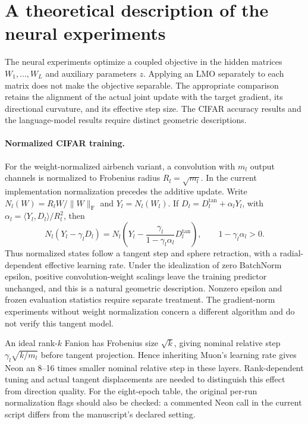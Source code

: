 
\section{A theoretical description of the neural experiments}
\label{tadl:section}

The neural experiments optimize a coupled objective in the hidden matrices
$W_1,\ldots,W_L$ and auxiliary parameters $z$. Applying an LMO separately
to each matrix does not make the objective separable. The appropriate
comparison retains the alignment of the actual joint update with the
target gradient, its directional curvature, and its effective step size.
The CIFAR accuracy results and the language-model results require distinct
geometric descriptions.

\paragraph{Normalized CIFAR training.}
For the weight-normalized airbench variant, a convolution with $m_l$ output
channels is normalized to Frobenius radius $R_l=\sqrt{m_l}$. In the current
implementation normalization precedes the additive update. Write
$N_l(W)=R_lW/\|W\|_{\mathrm F}$ and $Y_l=N_l(W_l)$. If
$D_l=D_l^{\mathrm{tan}}+\alpha_lY_l$, with
$\alpha_l=\langle Y_l,D_l\rangle/R_l^2$, then
\begin{equation}\label{tadl:normalization}
 N_l(Y_l-\gamma_lD_l)
 =N_l\left(Y_l-\frac{\gamma_l}{1-\gamma_l\alpha_l}
                      D_l^{\mathrm{tan}}\right),
 \qquad 1-\gamma_l\alpha_l>0.
\end{equation}
Thus normalized states follow a tangent step and sphere retraction, with a
radial-dependent effective learning rate. Under the idealization of zero
BatchNorm epsilon, positive convolution-weight scalings leave the
training predictor unchanged, and this is a natural geometric description.
Nonzero epsilon and frozen evaluation statistics require separate treatment.
The gradient-norm experiments without weight normalization concern a
different algorithm and do not verify this tangent model.

An ideal rank-$k$ Fanion has Frobenius size $\sqrt{k}$, giving nominal
relative step $\gamma_l\sqrt{k/m_l}$ before tangent projection. Hence
inheriting Muon's learning rate gives Neon an 8--16 times smaller nominal
relative step in these layers. Rank-dependent tuning and actual tangent
displacements are needed to distinguish this effect from direction quality.
For the eight-epoch table, the original per-run normalization flags should
also be checked: a commented Neon call in the current script differs from
the manuscript's declared setting.

